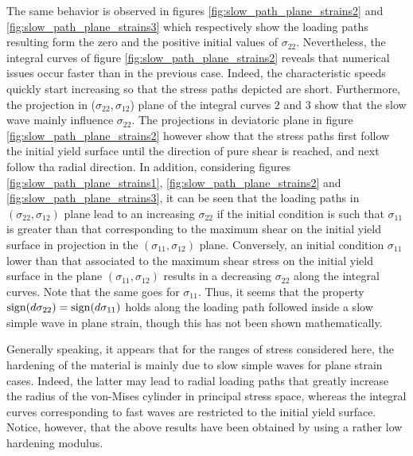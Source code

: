 The same behavior is observed in figures \ref{fig:slow_path_plane_strains2} and \ref{fig:slow_path_plane_strains3} which respectively show the loading paths resulting form the zero and the positive initial values of $\sigma_{22}$.
Nevertheless, the integral curves of figure \ref{fig:slow_path_plane_strains2} reveals that numerical issues occur faster than in the previous case.
Indeed, the characteristic speeds quickly start increasing so that the stress paths depicted are short.
Furthermore, the projection in ($\sigma_{22},\sigma_{12}$) plane of the integral curves $2$ and $3$ show that the slow wave mainly influence $\sigma_{22}$.
The projections in deviatoric plane in figure \ref{fig:slow_path_plane_strains2} however show that the stress paths first follow the initial yield surface until the direction of pure shear is reached, and next follow tha radial direction.
In addition, considering figures \ref{fig:slow_path_plane_strains1}, \ref{fig:slow_path_plane_strains2} and \ref{fig:slow_path_plane_strains3}, it can be seen that the loading paths in $(\sigma_{22},\sigma_{12})$ plane lead to an increasing $\sigma_{22}$ if the initial condition is such that $\sigma_{11}$ is greater than that corresponding to the maximum shear on the initial yield surface in projection in the $(\sigma_{11},\sigma_{12})$ plane.
Conversely, an initial condition $\sigma_{11}$ lower than that associated to the maximum shear stress on the initial yield surface in the plane $(\sigma_{11},\sigma_{12})$ results in a decreasing $\sigma_{22}$ along the integral curves.
Note that the same goes for $\sigma_{11}$.
Thus, it seems that the property $\operatorname{sign}(d\sigma_{22})=\operatorname{sign}(d\sigma_{11})$ holds along the loading path followed inside a slow simple wave in plane strain, though this has not been shown mathematically.

Generally speaking, it appears that for the ranges of stress considered here, the hardening of the material is mainly due to slow simple waves for plane strain cases.
Indeed, the latter may lead to radial loading paths that greatly increase the radius of the von-Mises cylinder in principal stress space, whereas the integral curves corresponding to fast waves are restricted to the initial yield surface. Notice, however, that the above results have been obtained by using a rather low hardening modulus.

